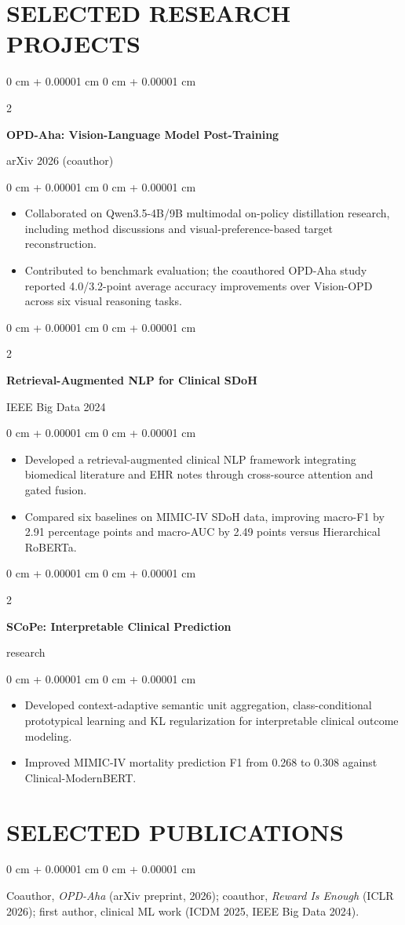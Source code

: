 \documentclass[10pt, letterpaper]{article}
\newenvironment{highlights}{
    \begin{itemize}[
        topsep=0.03 cm,
        parsep=0.03 cm,
        partopsep=0pt,
        itemsep=0pt,
        leftmargin=0 cm + 10pt
    ]
}{
    \end{itemize}
} %
\newenvironment{onecolentry}{
    \begin{adjustwidth}{
        0 cm + 0.00001 cm
    }{
        0 cm + 0.00001 cm
    }
}{
    \end{adjustwidth}
} %
\newenvironment{twocolentry}[2][]{
    \onecolentry
    \def\secondColumn{#2}
    \setcolumnwidth{\fill, 4.5 cm}
    \begin{paracol}{2}
}{
    \switchcolumn \raggedleft \secondColumn
    \end{paracol}
    \endonecolentry
} %
\begin{document}
\section{SELECTED RESEARCH PROJECTS}
\begin{twocolentry}{arXiv 2026 (coauthor)}
\textbf{OPD-Aha: Vision-Language Model Post-Training}
\end{twocolentry}
\begin{onecolentry}
\begin{highlights}
\item Collaborated on Qwen3.5-4B/9B multimodal on-policy distillation research, including method discussions and visual-preference-based target reconstruction.
\item Contributed to benchmark evaluation; the coauthored OPD-Aha study reported 4.0/3.2-point average accuracy improvements over Vision-OPD across six visual reasoning tasks.
\end{highlights}
\end{onecolentry}
\vspace{0.03 cm}
\begin{twocolentry}{IEEE Big Data 2024}
\textbf{Retrieval-Augmented NLP for Clinical SDoH}
\end{twocolentry}
\begin{onecolentry}
\begin{highlights}
\item Developed a retrieval-augmented clinical NLP framework integrating biomedical literature and EHR notes through cross-source attention and gated fusion.
\item Compared six baselines on MIMIC-IV SDoH data, improving macro-F1 by 2.91 percentage points and macro-AUC by 2.49 points versus Hierarchical RoBERTa.
\end{highlights}
\end{onecolentry}
\vspace{0.03 cm}
\begin{twocolentry}{2026 research}
\textbf{SCoPe: Interpretable Clinical Prediction}
\end{twocolentry}
\begin{onecolentry}
\begin{highlights}
\item Developed context-adaptive semantic unit aggregation, class-conditional prototypical learning and KL regularization for interpretable clinical outcome modeling.
\item Improved MIMIC-IV mortality prediction F1 from 0.268 to 0.308 against Clinical-ModernBERT.
\end{highlights}
\end{onecolentry}
\vspace{0.03 cm}
\section{SELECTED PUBLICATIONS}
\begin{onecolentry}
Coauthor, \textit{OPD-Aha} (arXiv preprint, 2026); coauthor, \textit{Reward Is Enough} (ICLR 2026); first author, clinical ML work (ICDM 2025, IEEE Big Data 2024).
\end{onecolentry}
\end{document}
